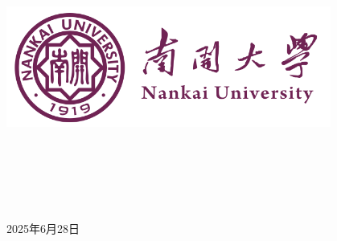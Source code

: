 \documentclass[a4paper]{article}
\newcommand{\HRule}{\rule{\linewidth}{0.5mm}}%
\begin{document}
\renewcommand{\contentsname}{目\ 录}
\renewcommand{\appendixname}{附录}
\renewcommand{\appendixpagename}{附录}
\renewcommand{\refname}{参考文献} 
\renewcommand{\figurename}{图}
\renewcommand{\tablename}{表}

\begin{titlepage}
    \begin{center}
    \includegraphics[width=0.8\textwidth]{fig/NKU.png}\\[1cm]
    \vspace{20mm}
		\textbf{\huge\textbf{}}\\[0.5cm]
		\textbf{\huge{}}\\[2.3cm]
		\textbf{\Huge\textbf{}}

		\vspace{\fill}
    
    \centering
    \textsc{\LARGE {}}\\[0.5cm]
    \textsc{\LARGE {}}\\[0.5cm]
    \textsc{\LARGE {}}\\[0.5cm]
    
    \vfill
    {\Large 2025年6月28日}
    \end{center}
\end{titlepage}
\end{document}

